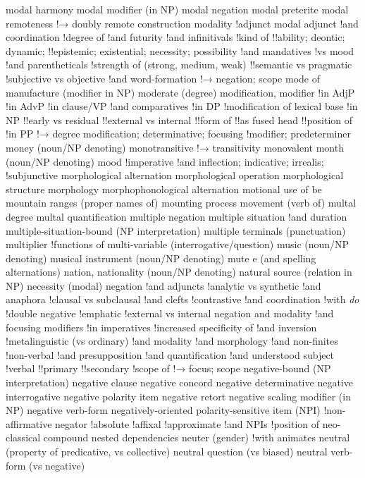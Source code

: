 modal harmony
modal modifier (in NP)
modal negation
modal preterite
modal remoteness
!→ doubly remote construction
modality
!adjunct modal adjunct
!and coordination
!degree of
!and futurity
!and infinitivals
!kind of
!!ability; deontic; dynamic;
!!epistemic; existential; necessity; possibility
!and mandatives
!vs mood
!and parentheticals
!strength of (strong, medium, weak)
!!semantic vs pragmatic
!subjective vs objective
!and word-formation
!→ negation; scope
mode of manufacture (modifier in NP)
moderate (degree)
modification, modifier
!in AdjP
!in AdvP
!in clause/VP
!and comparatives
!in DP
!modification of lexical base
!in NP
!!early vs residual
!!external vs internal
!!form of
!!as fused head
!!position of
!in PP
!→ degree modification; determinative; focusing
!modifier; predeterminer
money (noun/NP denoting)
monotransitive
!→ transitivity
monovalent
month (noun/NP denoting)
mood
!imperative
!and inflection; indicative; irrealis;
!subjunctive
morphological alternation
morphological operation
morphological structure
morphology
morphophonological alternation
motional use of be
mountain ranges (proper names of)
mounting process
movement (verb of)
multal degree
multal quantification
multiple negation
multiple situation
!and duration
multiple-situation-bound (NP interpretation)
multiple terminals (punctuation)
multiplier
!functions of
multi-variable (interrogative/question)
music (noun/NP denoting)
musical instrument (noun/NP denoting)
mute e (and spelling alternations)
nation, nationality (noun/NP denoting)
natural source (relation in NP)
necessity (modal)
negation
!and adjuncts
!analytic vs synthetic
!and anaphora
!clausal vs subclausal
!and clefts
!contrastive
!and coordination
!with \textit{do}
!double negative
!emphatic
!external vs internal negation and modality
!and focusing modifiers
!in imperatives
!increased specificity of
!and inversion
!metalinguistic (vs ordinary)
!and modality
!and morphology
!and non-finites
!non-verbal
!and presupposition
!and quantification
!and understood subject
!verbal
!!primary
!!secondary
!scope of
!→ focus; scope
negative-bound (NP interpretation)
negative clause
negative concord
negative determinative
negative interrogative
negative polarity item
negative retort
negative scaling modifier (in NP)
negative verb-form
negatively-oriented polarity-sensitive item (NPI)
!non-affirmative
negator
!absolute
!affixal
!approximate
!and NPIs
!position of
neo-classical compound
nested dependencies
neuter (gender)
!with animates
neutral (property of predicative, vs collective)
neutral question (vs biased)
neutral verb-form (vs negative)
